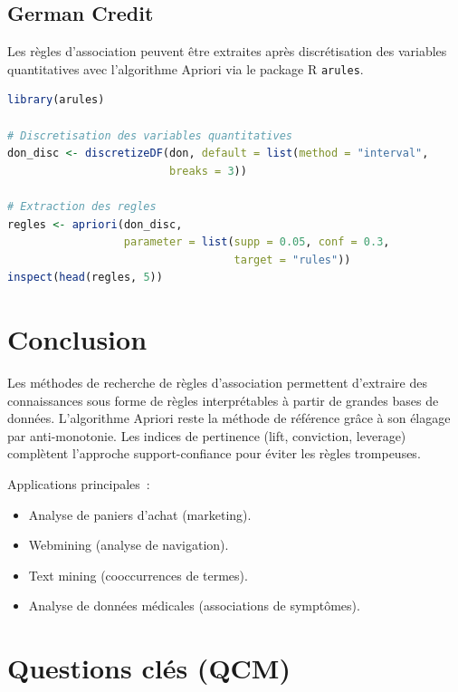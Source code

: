 \documentclass[a4paper,11pt]{article}
\theoremstyle{definition}
\theoremstyle{remark}
\begin{document}
\subsection{German Credit}

Les r\`egles d'association peuvent \^etre extraites apr\`es
discr\'etisation des variables quantitatives avec l'algorithme
Apriori via le package R \texttt{arules}.

\begin{lstlisting}[language=R]
library(arules)

# Discretisation des variables quantitatives
don_disc <- discretizeDF(don, default = list(method = "interval",
                         breaks = 3))

# Extraction des regles
regles <- apriori(don_disc,
                  parameter = list(supp = 0.05, conf = 0.3,
                                   target = "rules"))
inspect(head(regles, 5))
\end{lstlisting}

\section{Conclusion}

Les m\'ethodes de recherche de r\`egles d'association permettent
d'extraire des connaissances sous forme de r\`egles
interpr\'etables \`a partir de grandes bases de donn\'ees.
L'algorithme Apriori reste la m\'ethode de r\'ef\'erence gr\^ace
\`a son \'elagage par anti-monotonie. Les indices de pertinence
(lift, conviction, leverage) compl\`etent l'approche
support-confiance pour \'eviter les r\`egles trompeuses.

Applications principales~:
\begin{itemize}
  \item Analyse de paniers d'achat (marketing).
  \item Webmining (analyse de navigation).
  \item Text mining (cooccurrences de termes).
  \item Analyse de donn\'ees m\'edicales (associations de
    sympt\^omes).
\end{itemize}

\section*{Questions cl\'es (QCM)}
\end{document}
